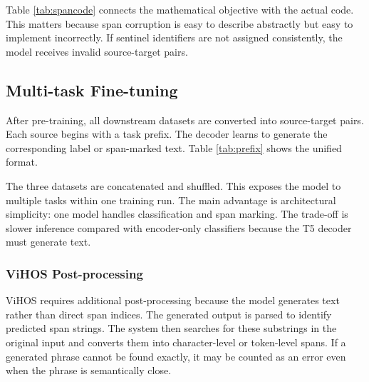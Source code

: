 \documentclass[journal]{IEEEtran}
\begin{document}
Table \ref{tab:spancode} connects the mathematical objective with the actual code. This matters because span corruption is easy to describe abstractly but easy to implement incorrectly. If sentinel identifiers are not assigned consistently, the model receives invalid source-target pairs.

\subsection{Multi-task Fine-tuning}
After pre-training, all downstream datasets are converted into source-target pairs. Each source begins with a task prefix. The decoder learns to generate the corresponding label or span-marked text. Table \ref{tab:prefix} shows the unified format.

\begin{table}[!t]
\centering
\caption{Task prefix format and expected outputs.}
\label{tab:prefix}
\end{table}

The three datasets are concatenated and shuffled. This exposes the model to multiple tasks within one training run. The main advantage is architectural simplicity: one model handles classification and span marking. The trade-off is slower inference compared with encoder-only classifiers because the T5 decoder must generate text.

\subsubsection{ViHOS Post-processing}
ViHOS requires additional post-processing because the model generates text rather than direct span indices. The generated output is parsed to identify predicted span strings. The system then searches for these substrings in the original input and converts them into character-level or token-level spans. If a generated phrase cannot be found exactly, it may be counted as an error even when the phrase is semantically close.
\end{document}
